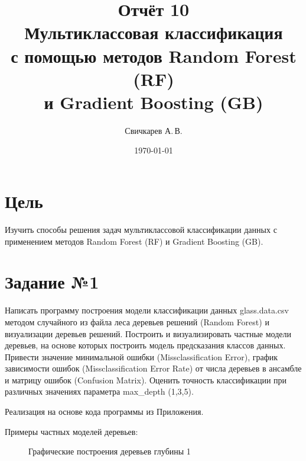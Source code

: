 \documentclass{article} %
\title{Отчёт 10\\
Мультиклассовая классификация\\
с помощью методов Random Forest (RF)\\
и Gradient Boosting (GB)} %
\author{Свичкарев А.\,В.} %
\date{\today} %
\begin{document}

\maketitle %

\section{Цель}
Изучить способы решения задач мультиклассовой классификации
данных с применением методов Random Forest (RF) и Gradient Boosting (GB).

\section{Задание №1}
Написать программу построения модели классификации данных
glass.data.csv методом случайного из файла
леса деревьев решений (Random Forest) и
визуализации деревьев решений.
Построить и визуализировать частные модели деревьев,
на основе которых построить модель предсказания классов данных.
Привести значение минимальной ошибки (Missclassification Error),
график зависимости ошибок (Missclassification Error Rate)
от числа деревьев в ансамбле и матрицу ошибок (Confusion Matrix).
Оценить точность классификации при различных значениях
параметра max\_depth (1,3,5).
\bigskip

Реализация на основе кода программы из Приложения.

\clearpage
Примеры частных моделей деревьев:
\begin{figure}[H]
	\centering
	\hfill
    \caption{Графические построения деревьев глубины 1}
\end{figure}
\bigskip
\end{document}
